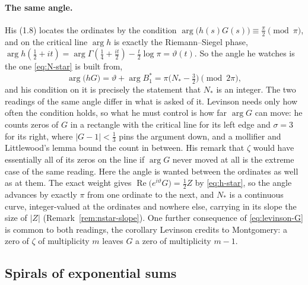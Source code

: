 \documentclass[11pt]{article}
\theoremstyle{definition}
\begin{document}
\paragraph{The same angle.} His (1.8) locates the ordinates by the condition
$\arg\bigl(h(s)G(s)\bigr)\equiv\tfrac{\pi}{2}\pmod\pi$, and on the critical line
$\arg h$ is exactly the Riemann--Siegel phase,
$\arg h(\tfrac12+it)=\arg\Gamma(\tfrac14+\tfrac{it}{2})-\tfrac{t}{2}\log\pi
=\vartheta(t)$. So the angle he watches is the one \eqref{eq:N-star} is built
from,
\[
\arg\bigl(hG\bigr)=\vartheta+\arg B_1^{\ast}
=\pi\bigl(N_{\ast}-\tfrac32\bigr)\pmod{2\pi},
\]
and his condition on it is precisely the statement that $N_{\ast}$ is an
integer. The two readings of the same angle differ in what is asked of it.
Levinson needs only how often the condition holds, so what he must control is
how far $\arg G$ can move: he counts zeros of $G$ in a rectangle with the
critical line for its left edge and $\sigma=3$ for its right, where
$|G-1|<\tfrac13$ pins the argument down, and a mollifier and Littlewood's
lemma bound the count in between. His remark that $\zeta$ would have
essentially all of its zeros on the line if $\arg G$ never moved at all is the
extreme case of the same reading. Here the angle is wanted between the
ordinates as well as at them. The exact weight gives
$\operatorname{Re}\bigl(e^{i\vartheta}G\bigr)=\tfrac12Z$ by \eqref{eq:h-star},
so the angle advances by exactly $\pi$ from one ordinate to the next, and
$N_{\ast}$ is a continuous curve, integer-valued at the ordinates and nowhere
else, carrying in its slope the size of $|Z|$
(Remark~\ref{rem:nstar-slope}). One further consequence of
\eqref{eq:levinson-G} is common to both readings, the corollary Levinson
credits to Montgomery: a zero of $\zeta$ of multiplicity $m$ leaves $G$ a zero
of multiplicity $m-1$.

\subsection{Spirals of exponential sums}\label{sec:curlicues}
\end{document}
